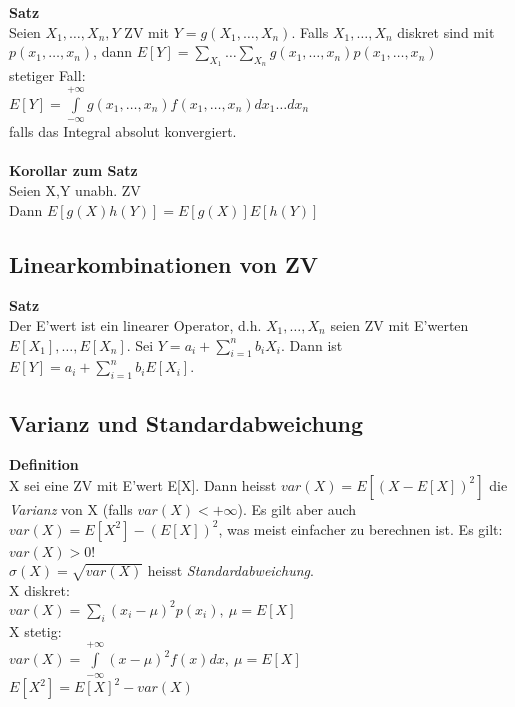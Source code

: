 \documentclass[10pt, a4paper, twocolumn]{scrartcl}
\begin{document}
\textbf{Satz}\\
Seien $X_1,\ldots,X_n,Y$ ZV mit $Y=g(X_1,\ldots,X_n)$. Falls $X_1,\ldots,X_n$ diskret sind mit $p(x_1,\ldots,x_n)$, dann $E[Y]=\sum\limits_{X_1}\ldots\sum\limits_{X_n}g(x_1,\ldots,x_n)p(x_1,\ldots,x_n)$\\
stetiger Fall:\\
$E[Y]=\int\limits^{+\infty}_{-\infty}g(x_1,\ldots,x_n)f(x_1,\ldots,x_n)dx_1\ldots dx_n$\\
falls das Integral absolut konvergiert.\\\\

\textbf{Korollar zum Satz}\\
Seien X,Y unabh. ZV\\
Dann $E[g(X)h(Y)]=E[g(X)]E[h(Y)]$

\subsection{Linearkombinationen von ZV}

\textbf{Satz}\\
Der E'wert ist ein linearer Operator, d.h. $X_1,\ldots,X_n$ seien ZV mit E'werten $E[X_1],\ldots,E[X_n]$. Sei $Y=a_i+\sum\limits^{n}_{i=1}b_i X_i$. Dann ist $E[Y]=a_i+\sum\limits^{n}_{i=1}b_i E[X_i]$.


\subsection{Varianz und Standardabweichung}

\textbf{Definition}\\
X sei eine ZV mit E'wert E[X]. Dann heisst $var(X)=E[(X-E[X])^2]$ die \textit{Varianz} von X (falls $var(X)<+\infty$). Es gilt aber auch $var(X)=E[X^2]-(E[X])^2$, was meist einfacher zu berechnen ist. Es gilt: $var(X)>0$!\\
$\sigma(X)=\sqrt{var(X)}$ heisst \textit{Standardabweichung}.\\

X diskret:\\
$var(X)=\sum\limits_{i}(x_i-\mu)^2p(x_i),\:\mu=E[X]$\\

X stetig:\\
$var(X)=\int\limits^{+\infty}_{-\infty}(x-\mu)^2f(x)dx,\:\mu=E[X]$\\

$E[X^2]=E[X]^2-var(X)$\\\\
\end{document}
